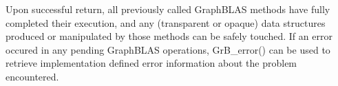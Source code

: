Upon successful return, all previously called GraphBLAS methods have
fully completed their execution, and 
 any (transparent or opaque) data
structures produced or manipulated by those methods can be safely touched.
If an error occured in any pending GraphBLAS operations, {\sf GrB\_error()}
can be used to retrieve implementation defined
error information about the problem encountered.


